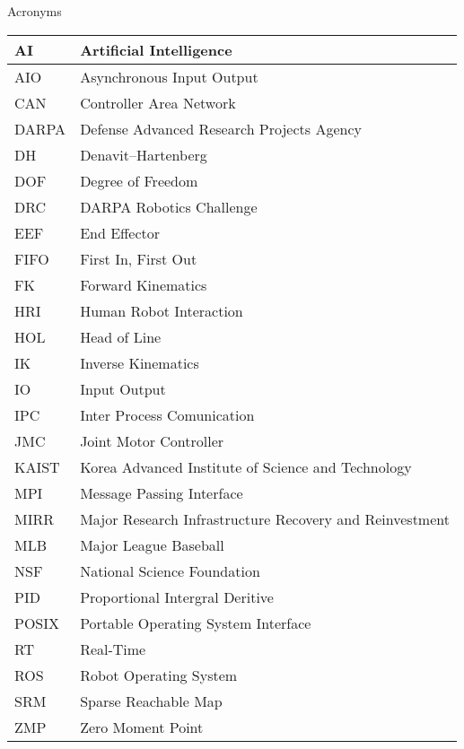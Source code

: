 \Large
\centering
Acronyms\\
\normalsize
\begin{tabular}{l | l}
\hline
AI & Artificial Intelligence\\
\hline
AIO & Asynchronous Input Output\\
\hline
CAN & Controller Area Network \\
\hline
DARPA  &  Defense Advanced Research Projects Agency\\
\hline 
DH & Denavit–Hartenberg \\
\hline
DOF & Degree of Freedom \\
\hline
DRC  & DARPA Robotics Challenge \\
\hline
EEF  & End Effector\\
\hline
FIFO & First In, First Out\\
\hline
FK & Forward Kinematics\\
\hline
HRI & Human Robot Interaction\\
\hline
HOL & Head of Line\\
\hline
IK & Inverse Kinematics\\ 
\hline
IO & Input Output\\
\hline
IPC & Inter Process Comunication \\
\hline
JMC & Joint Motor Controller\\
\hline
KAIST & Korea Advanced Institute of Science and Technology \\
\hline
MPI & Message Passing Interface\\
\hline
MIRR & Major Research Infrastructure Recovery and Reinvestment\\
\hline
MLB & Major League Baseball\\
\hline
NSF & National Science Foundation \\
\hline
PID & Proportional Intergral Deritive\\
\hline
POSIX & Portable Operating System Interface\\
\hline
RT & Real-Time\\
\hline
ROS & Robot Operating System\\
\hline
SRM & Sparse Reachable Map \\
\hline 
ZMP & Zero Moment Point\\
\hline
\end{tabular}
